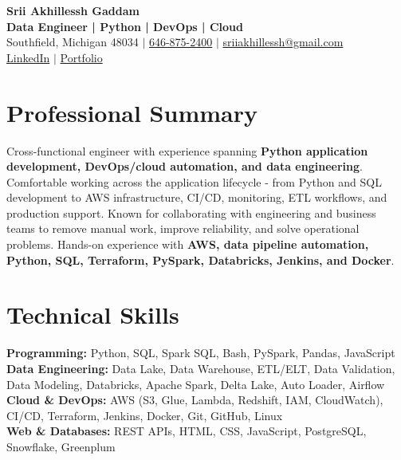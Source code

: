 \documentclass[letterpaper,10pt]{article}
\begin{document}
\fontsize{9.35pt}{10.45pt}\selectfont

\begin{center}
    {\LARGE \textbf{Srii Akhillessh Gaddam}} \\[-1pt]
    \textbf{Data Engineer | Python | DevOps | Cloud} \\[2pt]
    Southfield, Michigan 48034 $|$
    \href{tel:6468752400}{646-875-2400} $|$
    \href{mailto:sriiakhillessh@gmail.com}{sriiakhillessh@gmail.com} \\[1pt]
    \href{https://www.linkedin.com/in/srii-akhiilessh-gaddam-b48668191/}{LinkedIn} $|$
    \href{https://sriiakhillesshg.github.io/portfolio/}{Portfolio}
\end{center}
\vspace{-8pt}

\section{Professional Summary}
\small{Cross-functional engineer with experience spanning \textbf{Python application development, DevOps/cloud automation, and data engineering}. Comfortable working across the application lifecycle - from Python and SQL development to AWS infrastructure, CI/CD, monitoring, ETL workflows, and production support. Known for collaborating with engineering and business teams to remove manual work, improve reliability, and solve operational problems. Hands-on experience with \textbf{AWS, data pipeline automation, Python, SQL, Terraform, PySpark, Databricks, Jenkins, and Docker}.}

\section{Technical Skills}
\small{
\textbf{Programming:} Python, SQL, Spark SQL, Bash, PySpark, Pandas, JavaScript \\
\textbf{Data Engineering:} Data Lake, Data Warehouse, ETL/ELT, Data Validation, Data Modeling, Databricks, Apache Spark, Delta Lake, Auto Loader, Airflow \\
\textbf{Cloud \& DevOps:} AWS (S3, Glue, Lambda, Redshift, IAM, CloudWatch), CI/CD, Terraform, Jenkins, Docker, Git, GitHub, Linux \\
\textbf{Web \& Databases:} REST APIs, HTML, CSS, JavaScript, PostgreSQL, Snowflake, Greenplum
}
\end{document}
